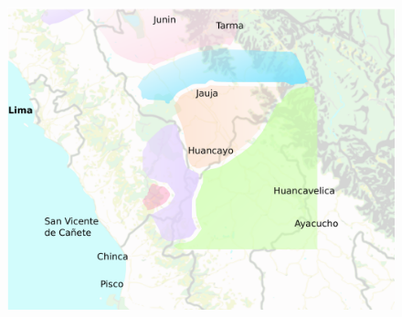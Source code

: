 \begin{figure}[!ht]
\begin{center}
\includegraphics[width=\textwidth]{figures/largerregion5.pdf}


\end{center}
\end{figure}

